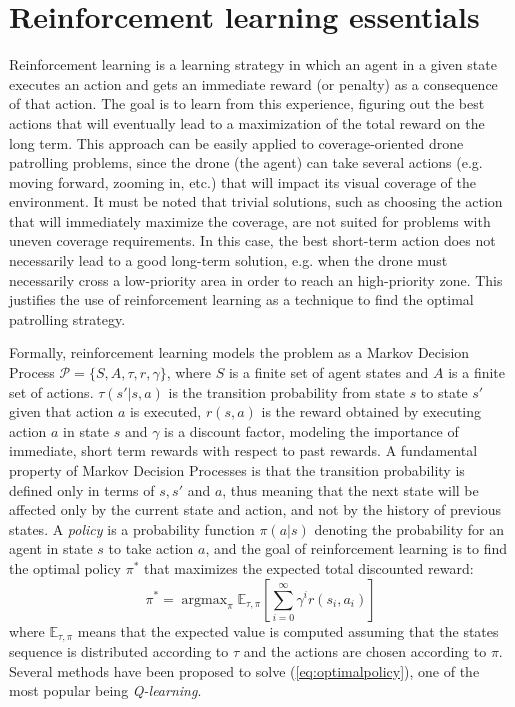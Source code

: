 \documentclass{article}
\DeclareMathOperator*{\argmax}{argmax}
\begin{document}
\section{Reinforcement learning essentials}
\label{sec:rl}
Reinforcement learning is a learning strategy in which an agent in a given state executes an action and gets an immediate reward (or penalty) as a consequence of that action. The goal is to learn from this experience, figuring out the best actions that will eventually lead to a maximization of the total reward on the long term. This approach can be easily applied to coverage-oriented drone patrolling problems, since the drone (the agent) can take several actions (e.g. moving forward, zooming in, etc.) that will impact its visual coverage of the environment. It must be noted that trivial solutions, such as choosing the action that will immediately maximize the coverage, are not suited for problems with uneven coverage requirements. In this case, the best short-term action does not necessarily lead to a good long-term solution, e.g. when the drone must necessarily  cross a low-priority area in order to reach an high-priority zone. This justifies the use of reinforcement learning as a technique to find the optimal patrolling strategy.

Formally, reinforcement learning models the problem as a Markov Decision Process $\mathcal{P} = \{S, A, \tau, r, \gamma \}$, where $S$ is a finite set of agent states and $A$ is a finite set of actions. $\tau(s'|s,a)$ is the transition probability from state $s$ to state $s'$ given that action $a$ is executed, $r(s,a)$ is the reward obtained by executing action $a$ in state $s$ and $\gamma$ is a discount factor, modeling the importance of immediate, short term rewards with respect to past rewards. A fundamental property of Markov Decision Processes is that the transition probability is defined only in terms of $s,s'$ and $a$, thus meaning that the next state will be affected only by the current state and action, and not by the history of previous states. A \emph{policy} is a probability function $\pi(a|s)$ denoting the probability for an agent in state $s$ to take action $a$, and the goal of reinforcement learning is to find the optimal policy $\pi^*$ that maximizes the expected total discounted reward:
\begin{equation}
\pi^* = \argmax_\pi  \mathbb{E}_{\tau, \pi} \left[ \sum_{i=0}^\infty \gamma^i r(s_i, a_i) \right]
\label{eq:optimalpolicy}
\end{equation}
where $\mathbb{E}_{\tau, \pi}$ means that the expected value is computed assuming that the states sequence is distributed according to $\tau$ and the actions are chosen according to $\pi$. Several methods have been proposed to solve (\ref{eq:optimalpolicy}), one of the most popular being \emph{Q-learning}.
\end{document}
